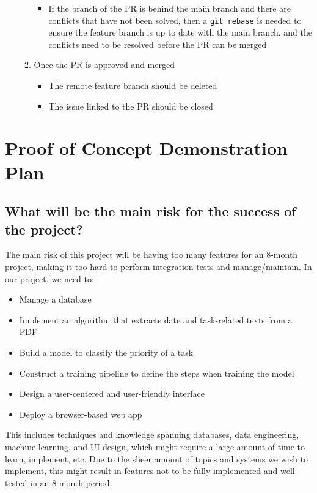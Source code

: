 \documentclass{article}
\begin{document}
\begin{itemize}
\begin{enumerate}
\begin{itemize}
                \item If the branch of the PR is behind the main branch and there are conflicts that have not been solved, then a \texttt{git rebase} is needed to ensure the feature branch is up to date with the main branch, and the conflicts need to be resolved before the PR can be merged
              \end{itemize}
            \item Once the PR is approved and merged
                \begin{itemize}
                    \item The remote feature branch should be deleted
                    \item The issue linked to the PR should be closed 
                \end{itemize}
        \end{enumerate}
\end{itemize}

\section{Proof of Concept Demonstration Plan}

\subsection*{What will be the main risk for the success of the project?} 
    The main risk of this project will be having too many features for an 8-month project, making it too hard to perform integration tests and manage/maintain. 
    In our project, we need to:
    \begin{itemize}
        \item Manage a database
        \item Implement an algorithm that extracts date and task-related texts from a PDF
        \item Build a model to classify the priority of a task
        \item Construct a training pipeline to define the steps when training the model
        \item Design a user-centered and user-friendly interface
        \item Deploy a browser-based web app
    \end{itemize}
    This includes techniques and knowledge spanning databases, data engineering, machine learning, and UI design, which might require a large amount of time to learn, implement, etc. Due to the sheer amount of topics and systems we wish to implement, this might result in features not to be fully implemented and well tested in an 8-month period.
\end{document}

